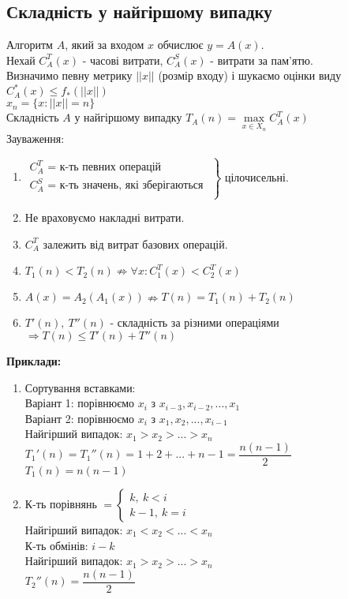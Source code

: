 \documentclass[a4paper,12pt]{article}
\begin{document}
 \newpage
    \subsection{Складність у найгіршому випадку}
    Алгоритм $A$, який за входом $x$ обчислює $y=A(x)$. \\
    Нехай $C_A^T(x)$ - часові витрати, $C_A^S(x)$ - витрати за пам'ятю. \\
    Визначимо певну метрику $||x||$ (розмір входу) і шукаємо 
    оцінки виду $C_A^*(x)\leqslant f_*(||x||)$ \\
    $x_n=\{x:||x||=n\}$ \\
    Складність $A$ у найгіршому випадку $T_A(n)=\max\limits_{x\in X_n}C_A^T(x)$ \\
    Зауваження:
    \begin{enumerate}
        \item 
        $\left.
            \begin{array}{ccc}
                C_A^T\textrm{ = к-ть певних операцій }  \\
                C_A^S\textrm{ = к-ть значень, які зберігаються } \\
            \end{array}
        \right\}$ цілочисельні.
        \item Не враховуємо накладні витрати.
        \item $C_A^T$ залежить від витрат базових операцій.
        \item $T_1(n)<T_2(n)\nRightarrow \forall x:C_1^T(x)<C_2^T(x)$
        \item $A(x)=A_2(A_1(x))\nRightarrow T(n)=T_1(n)+T_2(n)$
        \item $T'(n),\:T''(n)$ - складність за різними операціями $\Rightarrow T(n)\leqslant T'(n)+T''(n)$ 
    \end{enumerate}
    \textbf{Приклади:}
    \begin{enumerate}
        \item Сортування вставками: \\
        Варіант 1: порівнюємо $x_i$ з $x_{i-3},x_{i-2},...,x_1$ \\
        Варіант 2: порівнюємо $x_i$ з $x_1,x_2,...,x_{i-1}$ \\
        Найгірший випадок: $x_1>x_2>...>x_n$ \\
        $T_1'(n)=T_1''(n)=1+2+...+n-1=\dfrac{n(n-1)}{2}$ \\
        $T_1(n)=n(n-1)$
        \item К-ть порівнянь $=
        \begin{cases}
            k,\: k<i \\
            k-1,\: k=i
        \end{cases}$ \\
        Найгірший випадок: $x_1<x_2<...<x_n$ \\
        К-ть обмінів: $i-k$  \\
        Найгірший випадок: $x_1>x_2>...>x_n$ \\
        $T_2''(n)=\dfrac{n(n-1)}{2}$ 
    \end{enumerate}
\end{document}
